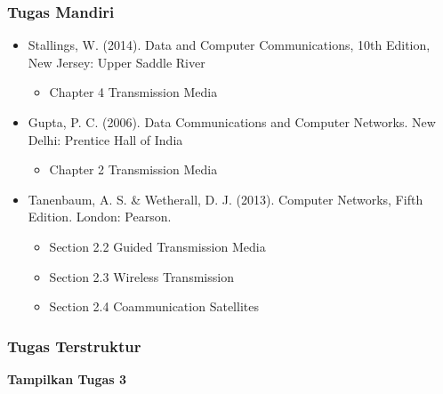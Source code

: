 \documentclass[pdflatex,compress]{beamer}
\begin{document}
\begin{frame}
	\frametitle{Tugas Mandiri}
	\begin{itemize}
		\item Stallings, W. (2014). Data and Computer Communications, 10th Edition, New Jersey: Upper Saddle River\\
		\begin{itemize}
			\item Chapter 4 Transmission Media
		\end{itemize}
		\item Gupta, P. C. (2006). Data Communications and Computer Networks. New Delhi: Prentice Hall of India\\
		\begin{itemize}
			\item Chapter 2 Transmission Media
		\end{itemize}
		\item Tanenbaum, A. S. \& Wetherall, D. J. (2013). Computer Networks, Fifth Edition. London: Pearson.\\
		\begin{itemize}
			\item Section 2.2 Guided Transmission Media
			\item Section 2.3 Wireless Transmission
			\item Section 2.4 Coammunication Satellites
		\end{itemize}
	\end{itemize}
\end{frame}

\begin{frame}
	\frametitle{Tugas Terstruktur}
	\textbf{Tampilkan Tugas 3}
\end{frame}
\end{document}
